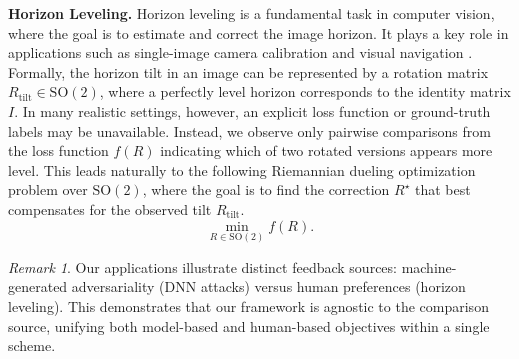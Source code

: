 \documentclass{article}
\theoremstyle{plain}
\theoremstyle{definition}
\theoremstyle{remark}
\newtheorem{remark}[theorem]{Remark}
\begin{document}



{\bf Horizon Leveling.}
Horizon leveling is a fundamental task in computer vision, where the goal is to estimate and correct the image horizon. It plays a key role in applications such as single-image camera calibration \citep{HoldGeoffroy2018} and visual navigation \citep{Ettinger2002}. 
Formally, the horizon tilt in an image can be represented by a rotation matrix $R_{\text{tilt}} \in \mathrm{SO}(2)$, where a perfectly level horizon corresponds to the identity matrix $I$. %
In many realistic settings, however, an explicit loss function or ground-truth labels may be unavailable. Instead, we observe only pairwise comparisons from the loss function $f(R)$ indicating which of two rotated versions appears more level. 
This leads naturally to the following Riemannian dueling optimization problem over $\mathrm{SO}(2)$, where the goal is to find the correction $R^\star$ that best compensates for the observed tilt $R_{\text{tilt}}$.
\begin{equation*}
    \min_{R \in \mathrm{SO}(2)} f(R).
\end{equation*}
\begin{remark}
Our applications illustrate distinct feedback sources: machine-generated adversariality (DNN attacks) versus human preferences (horizon leveling). This demonstrates that our framework is agnostic to the comparison source, unifying both model-based and human-based objectives within a single scheme.
\end{remark}
\end{document}
